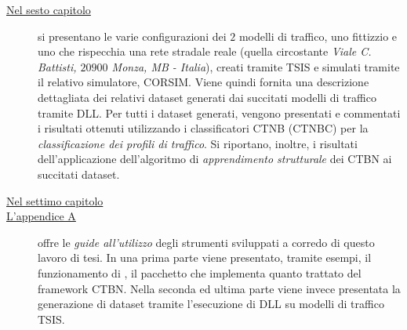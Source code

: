 \begin{description}
	\item[{\hyperref[cap:esperimenti]{Nel sesto capitolo}}]
	si presentano le varie configurazioni dei $2$ modelli di traffico, uno fittizzio e uno che rispecchia una rete stradale reale (quella circostante \emph{Viale C. Battisti, $20900$ Monza, MB - Italia}), creati tramite \acs{TSIS} e simulati tramite il relativo simulatore, \acs{CORSIM}. Viene quindi fornita una descrizione dettagliata dei relativi dataset generati dai succitati modelli di traffico tramite  \acs{DLL}. Per tutti i dataset generati, vengono presentati e commentati i risultati ottenuti utilizzando i classificatori \acs{CTNB} (\acs{CTNBC}) per la \emph{classificazione dei profili di traffico}. Si riportano, inoltre, i risultati dell'applicazione dell'algoritmo di \emph{apprendimento strutturale} dei \acs{CTBN} ai succitati dataset.
	\item[{\hyperref[cap:concl]{Nel settimo capitolo}}]
	\omissis{}
	\item[{\hyperref[cap:guide]{L'appendice A}}]
	offre le \emph{guide all'utilizzo} degli strumenti sviluppati a corredo di questo lavoro di tesi. In una prima parte viene presentato, tramite esempi, il funzionamento di , il pacchetto  che implementa quanto trattato del framework \acs{CTBN}. Nella seconda ed ultima parte viene invece presentata la generazione di dataset tramite l'esecuzione di  \acs{DLL} su modelli di traffico \acs{TSIS}.
\end{description}



